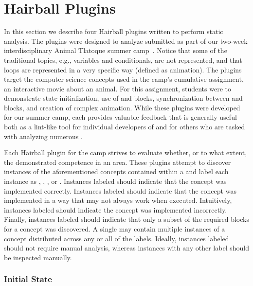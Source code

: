 \section{Hairball Plugins} 
In this section we describe four Hairball plugins written to perform
\sprogram{} static analysis.  The plugins were designed to analyze 
submitted as part of our two-week interdisciplinary Animal Tlatoque summer
camp~\cite{Franklin:2013:SBO}.  Notice that some of the traditional topics,
e.g., variables and conditionals, are not represented, and that loops are
represented in a very specific way (defined as animation). The plugins target
the computer science concepts used in the camp's cumulative assignment, an
interactive movie about an animal. For this assignment, students were to
demonstrate state initialization, use of \broadcast{} and \receive{} blocks,
synchronization between \say{} and \playsound{} blocks, and creation of complex
animation. While these plugins were developed for our summer camp, each
provides valuable feedback that is generally useful both as a lint-like tool
for individual developers of  and for others who are tasked with
analyzing numerous .

Each Hairball plugin for the camp strives to evaluate whether, or to what
extent, the \sprogram{} demonstrated competence in an area. These plugins
attempt to discover instances of the aforementioned concepts contained within a
\sprogram{} and label each instance as \correct{}, \semincor{}, \incor{}, or
\incom{}. Instances labeled \correct{} should indicate that the concept was
implemented correctly. Instances labeled \semincor{} should indicate that the
concept was implemented in a way that may not always work when
executed. Intuitively, instances labeled \incor{} should indicate the concept
was implemented incorrectly. Finally, instances labeled \incom{} should
indicate that only a subset of the required blocks for a concept was
discovered. A single \sprogram{} may contain multiple instances of a concept
distributed across any or all of the labels. Ideally, instances labeled
\correct{} should not require manual analysis, whereas instances with any other
label should be inspected manually.


\subsubsection{Initial State}

